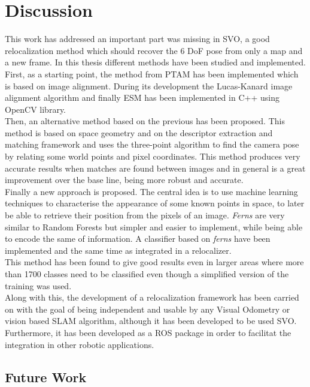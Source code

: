 \chapter{Discussion}\label{sec:discussion}

This work has addressed an important part was missing in SVO, a good relocalization method which should recover the 6 DoF pose from only a map and a new frame. In this thesis different methods have been studied and implemented. First, as a starting point, the method from PTAM has been implemented which is based on image alignment. During its development the Lucas-Kanard image alignment algorithm  and finally ESM has been implemented in C++ using OpenCV library.\\

Then, an alternative method based on the previous has been proposed. This method is based on space geometry and on the descriptor extraction and matching framework and uses the three-point algorithm to find the camera pose by relating some world points and pixel coordinates. This method produces very accurate results when matches are found between images and in general is a great improvement over the base line, being more robust and accurate.\\


Finally a new approach is proposed. The central idea is to use machine learning techniques to characterise the appearance of some known points in space, to later be able to retrieve their position from the pixels of an image. \textit{Ferns} are very similar to Random Forests but simpler and easier to implement, while being able to encode the same of information. A classifier based on \textit{ferns} have been implemented and the same time as integrated in a relocalizer.\\

This method has been found to give good results even in larger areas where more than 1700 classes need to be classified even though a simplified version of the training was used.\\

Along with this, the development of a relocalization framework has been carried on with the goal of being independent and usable by any Visual Odometry or vision based SLAM algorithm, although it has been developed to be used SVO. Furthermore, it has been developed as a ROS package in order to facilitat the integration in other robotic applications.\\


\section{Future Work}\label{sec:future_work}


